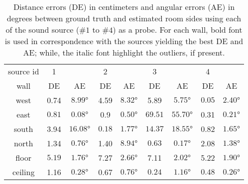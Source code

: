 \begin{table*}[h!]
\centering
\begin{tabular}{c|cc|cc|cc|cc}
\toprule	
source id &	1	& &	2	& &	3	& &	4 &	\\
wall &	DE&	AE&	DE&	AE&	DE&	AE&	DE&	AE\\
\hline
west &	0.74	& $\ang{8.99}$      & 4.59	& $\ang{8.32}$  & 5.89	& $\ang{5.75}$	& $\mathbf{0.05}$    & $\mathbf{\ang{2.40}}$\\
east &	$\mathbf{0.81}$	& $\mathbf{\ang{0.08}}$      & 0.9	& $\ang{0.50}$	&$\mathit{69.51}$	& $\mathit{\ang{55.70}}$	& 0.31    & $\ang{0.21}$\\
south&	3.94	&$\ang{16.08}$      & $\mathbf{0.18}$	& $\ang{1.77}$	&$\mathit{14.37}$ & $\mathit{\ang{18.55}}$	& 0.82    & $\mathbf{\ang{1.65}}$\\
north&	1.34	& $\ang{0.76}$	    & 1.40	& $\ang{8.94}$	& $\mathbf{0.63}$	& $\mathbf{\ang{0.17}}$	& 2.08    & $\ang{1.38}$\\
floor&	$\mathbf{5.19}$	& $\mathbf{\ang{1.76}}$	    & 7.27	& $\ang{2.66}$	& 7.11	& $\ang{2.02}$	& 5.22    & $\ang{1.90}$\\
ceiling&1.16	& $\ang{0.28}$	    & 0.67	& $\ang{0.76}$	& $\mathbf{0.24}$	& $\ang{1.16}$	& $0.48$    & $\mathbf{\ang{0.26}}$\\

\bottomrule
\end{tabular}
\caption{Distance errors (DE) in centimeters and angular errors (AE) in degrees between ground truth and estimated room sides using each of the sound source ($\#1$ to $\#4$) as a probe. For each wall, bold font is used in correspondence with the sources yielding the best DE and AE; while, the italic font highlight the outliers, if present.}
\label{tab:res_rooge}
\end{table*}